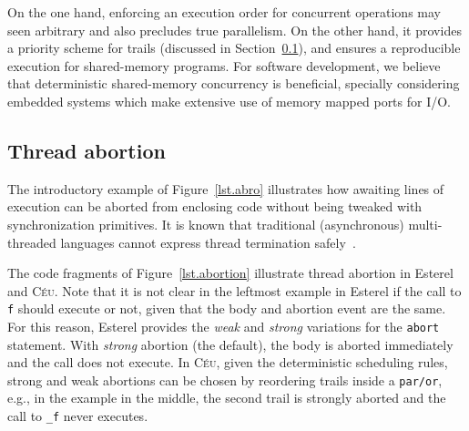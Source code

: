 \documentclass{acm_proc_article-sp}
\newcommand{\CEU}{\textsc{C\'{e}u}\xspace}
\newcommand{\code}[1] {{\small{\texttt{#1}}}}
\newcommand{\1}{\;}
\newcommand{\2}{\;\;}
\newcommand{\3}{\;\;\;}
\newcommand{\5}{\;\;\;\;\;}
\begin{document}
On the one hand, enforcing an execution order for concurrent operations may 
seen arbitrary and also precludes true parallelism.
On the other hand, it provides a priority scheme for trails (discussed in 
Section~\ref{sec.ceu.abortion}), and ensures a reproducible execution for 
shared-memory programs.
%
For software development, we believe that deterministic shared-memory 
concurrency is beneficial, specially considering embedded systems which make 
extensive use of memory mapped ports for I/O.

\begin{comment}
For instance, in Esterel, ``if a variable is written by some thread, then it 
can neither be read nor be written by concurrent 
threads''~\cite{esterel.primer}.

However, in Esterel, \emph{if a variable is written by some thread, then it can 
neither be read nor be written by concurrent threads}~\cite{esterel.primer} 
\end{comment}

\subsection{Thread abortion}
\label{sec.ceu.abortion}

The introductory example of Figure~\ref{lst.abro} illustrates how awaiting 
lines of execution can be aborted from enclosing code without being tweaked 
with synchronization primitives.
It is known that traditional (asynchronous) multi-threaded languages cannot 
express thread termination 
safely~\cite{esterel.preemption,sync_async.threadsstop}.

The code fragments of Figure~\ref{lst.abortion} illustrate thread abortion in 
Esterel and \CEU.
%
Note that it is not clear in the leftmost example in Esterel if the call to 
\code{f} should execute or not, given that the body and abortion event are the 
same.
%
For this reason, Esterel provides the \emph{weak} and \emph{strong} variations 
for the \code{abort} statement.
With \emph{strong} abortion (the default), the body is aborted immediately and 
the call does not execute.
%
In \CEU, given the deterministic scheduling rules, strong and weak abortions 
can be chosen by reordering trails inside a \code{par/or}, e.g., in the example 
in the middle, the second trail is strongly aborted and the call to \code{\_f} 
never executes.
\end{document}
